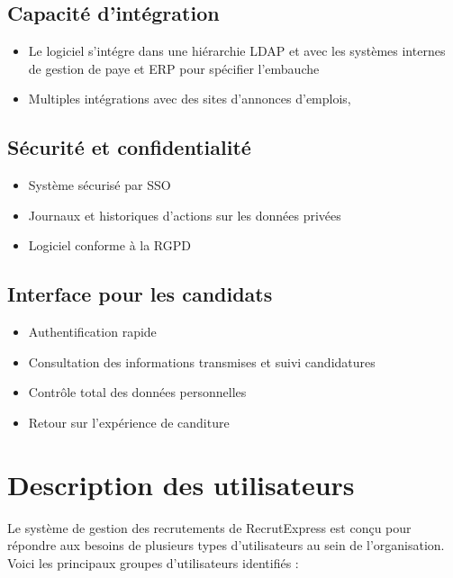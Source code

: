 \documentclass{scrreprt}
\begin{document}
\subsection{Capacité d'intégration}
\begin{itemize}
    \item Le logiciel s’intégre dans une hiérarchie LDAP et avec les systèmes internes de gestion de paye et ERP pour spécifier l’embauche
    \item Multiples intégrations avec des sites d'annonces d'emplois, 
\end{itemize}

\subsection{Sécurité et confidentialité}
\begin{itemize}
    \item Système sécurisé par SSO
    \item Journaux et historiques d'actions sur les données privées
    \item Logiciel conforme à la RGPD
\end{itemize}

\subsection{Interface pour les candidats}
\begin{itemize}
    \item Authentification rapide
    \item Consultation des informations transmises et suivi candidatures
    \item Contrôle total des données personnelles
    \item Retour sur l'expérience de canditure
\end{itemize}

\section{Description des utilisateurs}

Le système de gestion des recrutements de RecrutExpress est conçu pour répondre aux besoins de plusieurs types d'utilisateurs au sein de l'organisation. Voici les principaux groupes d'utilisateurs identifiés :
\end{document}
